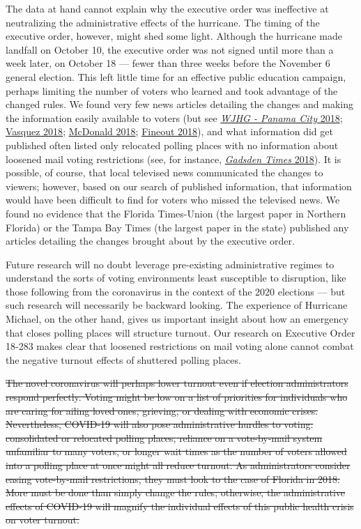 \documentclass[
  12pt,
]{article}
\begin{document}
The data at hand cannot explain why the executive order was ineffective at neutralizing the administrative effects of the hurricane. The timing of the executive order, however, might shed some light. Although the hurricane made landfall on October 10, the executive order was not signed until more than a week later, on October 18 --- fewer than three weeks before the November 6 general election. This left little time for an effective public education campaign, perhaps limiting the number of voters who learned and took advantage of the changed rules. We found very few news articles detailing the changes and making the information easily available to voters (but see \protect\hyperlink{ref-WJHG2018}{\emph{WJHG - Panama City} 2018}; \protect\hyperlink{ref-Vasquez2018}{Vasquez 2018}; \protect\hyperlink{ref-McDonald2018}{McDonald 2018}; \protect\hyperlink{ref-Fineout2018}{Fineout 2018}), and what information did get published often listed only relocated polling places with no information about loosened mail voting restrictions (see, for instance, \protect\hyperlink{ref-gadsdentimes2018}{\emph{Gadsden Times} 2018}). It is possible, of course, that local televised news communicated the changes to viewers; however, based on our search of published information, that information would have been difficult to find for voters who missed the televised news. We found no evidence that the Florida Times-Union (the largest paper in Northern Florida) or the Tampa Bay Times (the largest paper in the state) published any articles detailing the changes brought about by the executive order.

Future research will no doubt leverage pre-existing administrative regimes to understand the sorts of voting environments least susceptible to disruption, like those following from the coronavirus in the context of the 2020 elections --- but such research will necessarily be backward looking. The experience of Hurricane Michael, on the other hand, gives us important insight about how an emergency that closes polling places will structure turnout. Our research on Executive Order 18-283 makes clear that loosened restrictions on mail voting alone cannot combat the negative turnout effects of shuttered polling places.

\sout{The novel coronavirus will perhaps lower turnout even if election administrators respond perfectly. Voting might be low on a list of priorities for individuals who are caring for ailing loved ones, grieving, or dealing with economic crises. Nevertheless, COVID-19 will also pose administrative hurdles to voting: consolidated or relocated polling places, reliance on a vote-by-mail system unfamiliar to many voters, or longer wait times as the number of voters allowed into a polling place at once might all reduce turnout. As administrators consider easing vote-by-mail restrictions, they must look to the case of Florida in 2018. More must be done than simply change the rules; otherwise, the administrative effects of COVID-19 will magnify the individual effects of this public health crisis on voter turnout.}
\end{document}
